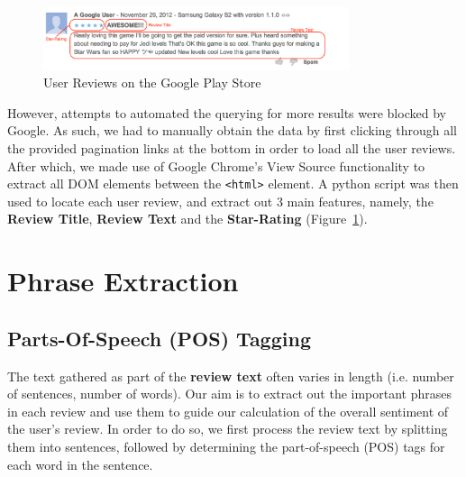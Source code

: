 \documentclass[11pt]{report} %
\begin{document}
\begin{figure}[h!]
  \centering
    \includegraphics[width=0.8\textwidth]{figures/user_review.png}
 \caption{User Reviews on the Google Play Store}
\label{fig:user_review}
\end{figure}

However, attempts to automated the querying for more results were blocked by Google. As such, we had to manually obtain the data by first clicking through all the provided pagination links at the bottom in order to load all the user reviews. After which, we made use of Google Chrome's View Source functionality to extract all DOM elements between the \verb|<html>| element. A python script was then used to locate each user review, and extract out 3 main features, namely, the \textbf{Review Title}, \textbf{Review Text} and the \textbf{Star-Rating} (Figure~\ref{fig:user_review}).

\section{Phrase Extraction}
\label{subsection:phrase_extraction}
\subsection{Parts-Of-Speech (POS) Tagging}
The text gathered as part of the \textbf{review text} often varies in length (i.e. number of sentences, number of words). Our aim is to extract out the important phrases in each review and use them to guide our calculation of the overall sentiment of the user's review. In order to do so, we first process the review text by splitting them into sentences, followed by determining the part-of-speech (POS) tags for each word in the sentence. 
\end{document}
